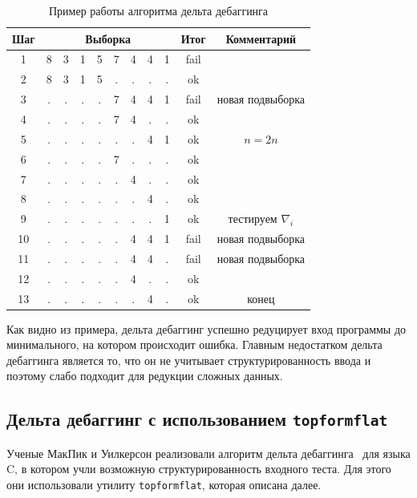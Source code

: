 %
\begin{table}[H]
\center
\captionsetup{skip=5pt}
\caption{\label{tab:ddminex2}Пример работы алгоритма дельта дебаггинга}
\small
\begin{tabular}{| c | *{8}{c} | c | c |}
\hline
\bf Шаг & \multicolumn{8}{|c|}{\bf Выборка} & {\bf Итог} & {\bf Комментарий}\\
\hline
1 &  8 & 3 & 1 & 5 & 7 & 4 & 4 & 1  & fail & \\
\hline
2 &  8 & 3 & 1 & 5 & . & . & . & .  & ok & \\
\hline
3 &  . & . & . & . & 7 & 4 & 4 & 1 & fail & новая подвыборка\\
\hline
4 &  . & . & . & . & 7 & 4 & . & . & ok & \\
\hline
5 &  . & . & . & . & . & . & 4 & 1 & ok & $n = 2n$\\
\hline
6 &  . & . & . & . & 7 & . & . & . & ok & \\
\hline
7 &  . & . & . & . & . & 4 & . & . & ok &\\
\hline
8 &  . & . & . & . & . & . & 4 & . & ok &\\
\hline
9 &  . & . & . & . & . & . & . & 1 & ok &тестируем $\nabla_i$\\
\hline
10 &  . & . & . & . & . & 4 & 4 & 1 & fail &новая подвыборка\\
\hline
11 &  . & . & . & . & . & 4 & 4 & . & fail &новая подвыборка\\
\hline
12 &  . & . & . & . & . & 4 & . & . & ok &\\
\hline
13 &  . & . & . & . & . & . & 4 & . & ok & конец\\
\hline
\end{tabular}
\end{table}
%
Как видно из примера, дельта дебаггинг успешно редуцирует вход программы до минимального, на котором происходит ошибка. Главным недостатком дельта дебаггинга является то, что он не учитывает структурированность ввода и поэтому слабо подходит для редукции сложных данных.

\subsection{Дельта дебаггинг с использованием \texttt{topformflat}}
Ученые МакПик и Уилкерсон реализовали алгоритм дельта дебаггинга~\cite{delta} для языка C, в котором учли возможную структурированность входного теста. Для этого они использовали утилиту \texttt{topformflat}, которая описана далее.

